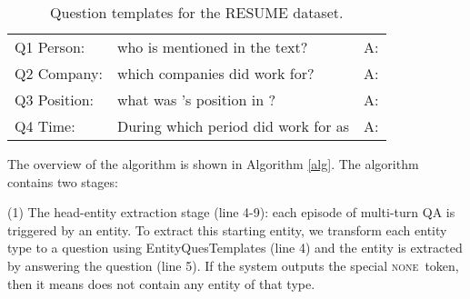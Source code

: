 \documentclass[11pt,a4paper]{article}
\newcommand{\none}{\textsc{none}~}
\begin{document}
\begin{table*}[!ht]
\center
\begin{tabular}{lll}\hline
Q1 Person:& who is mentioned in the text? &A:  \\
Q2 Company:& which companies did  work for? & A:  \\
Q3 Position:& what was 's position in ? & A:  \\
Q4 Time:& During which period did  work for  as  & A:  \\\hline
\end{tabular}
\caption{Question templates for the RESUME dataset. }
\label{resumetem}
\end{table*}
\begin{comment}
\textsc{org-aff}&GPE & ORG&  find  an  organization  which  is  invested  by  XXX \\
& & & XXX; organization affiliation; organization \\\hline 
\textsc{part-whole}&GPE & GPE&   find  a  geo political  entity  which  is  controlled  by  XXX\\
& & & XXX; part whole; geo-political entity \\\hline 
\textsc{part-whole}&GPE & LOC&   find  a  location  geographically  related  to  XXX\\
& & & XXX; part whole; location \\\hline 
\textsc{phys}&GPE & GPE&   find  a  geo political  entity  near  XXX\\ 
& & & XXX; physical; geo-political entity \\\hline 
\textsc{art}&ORG & FAC&   find a facility that XXX is the user, owner, or manufacturer \\ 
& & & XXX; agent artifact; facility \\\hline 
\textsc{art}&ORG & VEH&   find a vehicle that XXX is the user, owner, or manufacturer \\ 
& & & XXX; agent artifact; vehicle \\\hline 
\textsc{gen-aff}&ORG & GPE&   find a geo political entity that XXX locates, is based \\ 
& & & XXX; has affiliation; geo-political entity \\
\end{comment}

The overview of the algorithm is shown in  Algorithm \ref{alg}.
The algorithm contains two stages: 

 (1) The head-entity extraction stage (line 4-9):
 each episode of multi-turn QA is triggered by an entity. 
 To extract this starting entity, 
  we transform 
    each entity type to a question using EntityQuesTemplates (line 4) and the entity  is extracted by answering the question (line 5).
   If the system outputs the special \none  token, then it means  does not contain any entity of that type.
   
\end{document}
